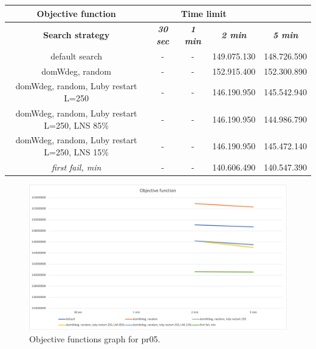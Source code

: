 {
\renewcommand{\arraystretch}{2}
\begin{longtable}[h]{| c | c | c | c | c |}
    \hline
    \textbf{Objective function} & \multicolumn{3}{c}{Time limit} & \\
    \hline
    \textbf{Search strategy} & \textbf{\textit{30 sec}} & \textbf{\textit{1 min}} & \textbf{\textit{2 min}} & \textbf{\textit{5 min}} \\
    \hline
    \endhead
    default search                                        & - & - & 149.075.130 & 148.726.590 \\
    \hline
    domWdeg, random                                       & - & - & 152.915.400 & 152.300.890 \\
    \hline
    domWdeg, random, Luby restart L=250                   & - & - & 146.190.950 & 145.542.940 \\
    \hline
    domWdeg, random, Luby restart L=250, LNS 85\%         & - & - & 146.190.950 & 144.986.790 \\
    \hline
    domWdeg, random, Luby restart L=250, LNS 15\%         & - & - & 146.190.950 & 145.472.140 \\
    \hline
    \textit{first fail, min}                              & - & - & 140.606.490 & 140.547.390 \\
    \hline
\end{longtable}
}
\begin{figure}[H]
    \centering
    \includegraphics[width=1.0\columnwidth]{../graphs/pr05-objf.png}
    \caption{Objective functions graph for pr05.}
\end{figure}

